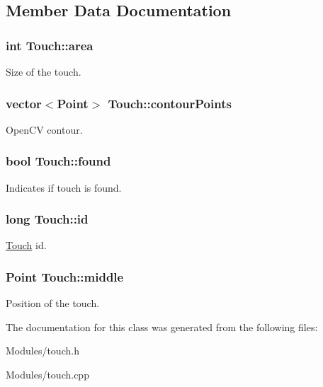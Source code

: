 \subsection{Member Data Documentation}
\hypertarget{class_touch_a85f862123de103d39633b7908e5bf7f4}{
\subsubsection[{area}]{\setlength{\rightskip}{0pt plus 5cm}int {\bf Touch::area}}}
\label{d1/dff/class_touch_a85f862123de103d39633b7908e5bf7f4}
Size of the touch. \hypertarget{class_touch_a6ebb852bd12d77132fe620eeda6ee656}{
\subsubsection[{contourPoints}]{\setlength{\rightskip}{0pt plus 5cm}vector$<$Point$>$ {\bf Touch::contourPoints}}}
\label{d1/dff/class_touch_a6ebb852bd12d77132fe620eeda6ee656}
OpenCV contour. \hypertarget{class_touch_ad6a3432e444a0d5613605590e9869cdd}{
\subsubsection[{found}]{\setlength{\rightskip}{0pt plus 5cm}bool {\bf Touch::found}}}
\label{d1/dff/class_touch_ad6a3432e444a0d5613605590e9869cdd}
Indicates if touch is found. \hypertarget{class_touch_ac21e0b89b6e9f809fde5353217519d75}{
\subsubsection[{id}]{\setlength{\rightskip}{0pt plus 5cm}long {\bf Touch::id}}}
\label{d1/dff/class_touch_ac21e0b89b6e9f809fde5353217519d75}
\hyperlink{class_touch}{Touch} id. \hypertarget{class_touch_a99a257ba0f4db4eff3be1e42577ff40f}{
\subsubsection[{middle}]{\setlength{\rightskip}{0pt plus 5cm}Point {\bf Touch::middle}}}
\label{d1/dff/class_touch_a99a257ba0f4db4eff3be1e42577ff40f}
Position of the touch. 

The documentation for this class was generated from the following files:\begin{DoxyCompactItemize}
\item 
Modules/touch.h\item 
Modules/touch.cpp\end{DoxyCompactItemize}
